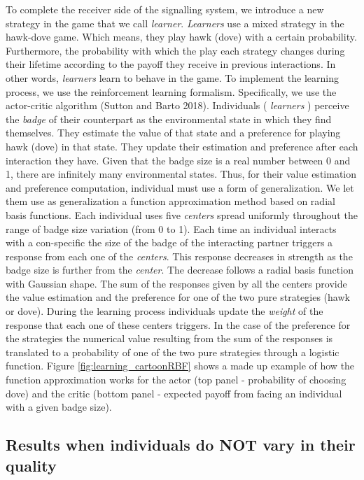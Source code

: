 \documentclass[
]{article}
\begin{document}
To complete the receiver side of the signalling system, we introduce a
new strategy in the game that we call \emph{learner}. \emph{Learners}
use a mixed strategy in the hawk-dove game. Which means, they play hawk
(dove) with a certain probability. Furthermore, the probability with
which the play each strategy changes during their lifetime according to
the payoff they receive in previous interactions. In other words,
\emph{learners} learn to behave in the game. To implement the learning
process, we use the reinforcement learning formalism. Specifically, we
use the actor-critic algorithm (Sutton and Barto 2018). Individuals (
\emph{learners} ) perceive the \emph{badge} of their counterpart as the
environmental state in which they find themselves. They estimate the
value of that state and a preference for playing hawk (dove) in that
state. They update their estimation and preference after each
interaction they have. Given that the badge size is a real number
between 0 and 1, there are infinitely many environmental states. Thus,
for their value estimation and preference computation, individual must
use a form of generalization. We let them use as generalization a
function approximation method based on radial basis functions. Each
individual uses five \emph{centers} spread uniformly throughout the
range of badge size variation (from 0 to 1). Each time an individual
interacts with a con-specific the size of the badge of the interacting
partner triggers a response from each one of the \emph{centers}. This
response decreases in strength as the badge size is further from the
\emph{center}. The decrease follows a radial basis function with
Gaussian shape. The sum of the responses given by all the centers
provide the value estimation and the preference for one of the two pure
strategies (hawk or dove). During the learning process individuals
update the \emph{weight} of the response that each one of these centers
triggers. In the case of the preference for the strategies the numerical
value resulting from the sum of the responses is translated to a
probability of one of the two pure strategies through a logistic
function. Figure \ref{fig:learning_cartoonRBF} shows a made up example
of how the function approximation works for the actor (top panel -
probability of choosing dove) and the critic (bottom panel - expected
payoff from facing an individual with a given badge size).

\hypertarget{results-when-individuals-do-not-vary-in-their-quality}{%
\subsection{Results when individuals do NOT vary in their
quality}\label{results-when-individuals-do-not-vary-in-their-quality}}
\end{document}

